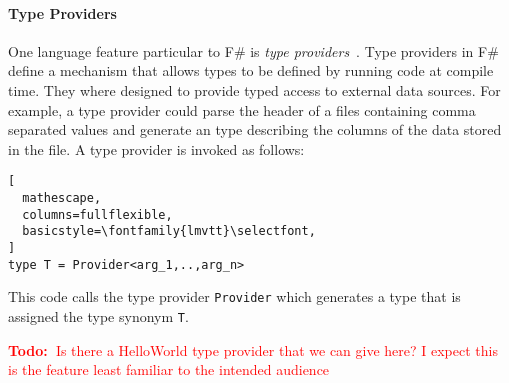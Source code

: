 \documentclass{sigplanconf}
\newcommand{\todo}[1]{
\ifthenelse
  {\boolean{showNotes}}
  {\textcolor{red}{\textbf{Todo:~}#1}}
  {}}
\begin{document}
\paragraph{Type Providers}
One language feature particular to F\# is \emph{type
  providers}~\cite{typeProviders}. Type providers in F\# define a
mechanism that allows types to be defined by running code at compile
time. They where designed to provide typed access to external data
sources. For example, a type provider could parse the header of a
files containing comma separated values and generate an type
describing the columns of the data stored in the file. A type provider
is invoked as follows:
\begin{lstlisting}[
  mathescape,
  columns=fullflexible,
  basicstyle=\fontfamily{lmvtt}\selectfont,
]
type T = Provider<arg_1,..,arg_n>
\end{lstlisting}
This code calls the type provider \verb+Provider+ which generates a
type that is assigned the type synonym \verb+T+.

\todo{Is there a HelloWorld type provider that we can give here? I
  expect this is the feature least familiar to the intended audience}
\end{document}
